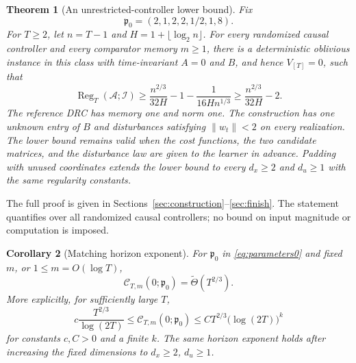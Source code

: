 \documentclass[11pt]{article}
\newtheorem{theorem}{Theorem}[section]
\newtheorem{corollary}[theorem]{Corollary}
\theoremstyle{remark}
\newcommand{\Reg}{\operatorname{Reg}}
\newcommand{\cclass}{\mathcal C}
\begin{document}
\begin{theorem}[An unrestricted-controller lower bound]\label{thm:main}
Fix
\begin{equation}\label{eq:parameters0}
 \mathfrak p_0=(2,1,2,2,1/2,1,8).
\end{equation}
For $T\ge2$, let $n=T-1$ and $H=1+\lfloor\log_2n\rfloor$.
For every randomized causal controller and every comparator memory
$m\ge1$, there is a deterministic oblivious instance in this class with
time-invariant $A=0$ and $B$, and hence $V_{[T]}=0$, such that
\begin{equation}\label{eq:explicitlb}
 \Reg_T(\mathcal A;\mathcal I)
 \ge \frac{n^{2/3}}{32H}-1-\frac{1}{16Hn^{1/3}}
 \ge \frac{n^{2/3}}{32H}-2.
\end{equation}
The reference DRC has memory one and norm one. The construction has one
unknown entry of $B$ and disturbances satisfying $\|w_t\|<2$ on every
realization. The lower bound remains valid when the cost functions, the
two candidate matrices, and the disturbance law are given to the learner
in advance. Padding with unused coordinates extends the lower bound to
every $d_x\ge2$ and $d_u\ge1$ with the same regularity constants.
\end{theorem}

The full proof is given in Sections~\ref{sec:construction}--\ref{sec:finish}.
The statement quantifies over all randomized causal controllers; no bound
on input magnitude or computation is imposed.

\begin{corollary}[Matching horizon exponent]\label{cor:matching}
For $\mathfrak p_0$ in \eqref{eq:parameters0} and fixed
$m$, or $1\le m=O(\log T)$,
\begin{equation}\label{eq:matching}
 \cclass_{T,m}(0;\mathfrak p_0)=\widetilde\Theta(T^{2/3}).
\end{equation}
More explicitly, for sufficiently large $T$,
\[
 c\frac{T^{2/3}}{\log(2T)}
 \le\cclass_{T,m}(0;\mathfrak p_0)
 \le C T^{2/3}\bigl(\log(2T)\bigr)^k
\]
for constants $c,C>0$ and a finite $k$. The same horizon exponent holds
after increasing the fixed dimensions to $d_x\ge2$, $d_u\ge1$.
\end{corollary}
\end{document}
